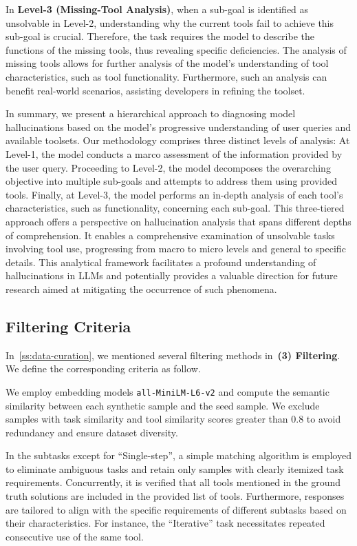 \documentclass[11pt]{article}
\begin{document}
In \textbf{Level-3 (Missing-Tool Analysis)}, when a sub-goal is identified as unsolvable in Level-2, understanding why the current tools fail to achieve this sub-goal is crucial.
Therefore, the task requires the model to describe the functions of the missing tools, thus revealing specific deficiencies.
The analysis of missing tools allows for further analysis of the model's understanding of tool characteristics, such as tool functionality. 
Furthermore, such an analysis can benefit real-world scenarios, assisting developers in refining the toolset. 

In summary, we present a hierarchical approach to diagnosing model hallucinations based on the model's progressive understanding of user queries and available toolsets. Our methodology comprises three distinct levels of analysis:
At Level-1, the model conducts a marco assessment of the information provided by the user query.
Proceeding to Level-2, the model decomposes the overarching objective into multiple sub-goals and attempts to address them using provided tools.
Finally, at Level-3, the model performs an in-depth analysis of each tool's characteristics, such as functionality, concerning each sub-goal.
This three-tiered approach offers a perspective on hallucination analysis that spans different depths of comprehension. 
It enables a comprehensive examination of unsolvable tasks involving tool use, progressing from macro to micro levels and general to specific details.
This analytical framework facilitates a profound understanding of hallucinations in LLMs and potentially provides a valuable direction for future research aimed at mitigating the occurrence of such phenomena.


\subsection{Filtering Criteria}
\label{append:filter-criteria}

In~\cref{ss:data-curation}, we mentioned several filtering methods in~\textbf{(3) Filtering}. 
We define the corresponding criteria as follow.

We employ embedding models \texttt{all-MiniLM-L6-v2} and compute the semantic similarity between each synthetic sample and the seed sample. 
We exclude samples with task similarity and tool similarity scores greater than $0.8$ to avoid redundancy and ensure dataset diversity.
    
In the subtasks except for ``Single-step'', a simple matching algorithm is employed to eliminate ambiguous tasks and retain only samples with clearly itemized task requirements. 
Concurrently, it is verified that all tools mentioned in the ground truth solutions are included in the provided list of tools. 
Furthermore, responses are tailored to align with the specific requirements of different subtasks based on their characteristics. For instance, the ``Iterative'' task necessitates repeated consecutive use of the same tool.
    
\end{document}
